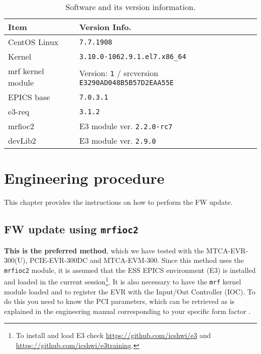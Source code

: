 \documentclass[11pt
  , a4paper
  , article
  , oneside
  , showtrims
]{memoir}
\begin{document}
\begin{table}[!htb]
  \centering
  \begin{tabular}{l|l}
    \toprule
    Item               & Version Info.                                                      \\\midrule
    CentOS Linux       & \texttt{7.7.1908}                                                  \\\midrule
    Kernel             & \texttt{3.10.0-1062.9.1.el7.x86\_64}                               \\\midrule
    mrf kernel module  & Version: \texttt{1} / srcversion \texttt{E3290AD048B5B57D2EAA55E}  \\\midrule
    EPICS base         & \texttt{7.0.3.1}                                                   \\\midrule
    e3-req             & \texttt{3.1.2}                                                     \\\midrule
    mrfioc2            & E3 module ver. \texttt{2.2.0-rc7}                                  \\\midrule
    devLib2            & E3 module ver. \texttt{2.9.0}                                      \\\bottomrule
  \end{tabular}
  \caption[]{Software and its version information.}
  \label{table:swlist}
\end{table}



\chapter{Engineering procedure}
This chapter provides the instructions on how to perform the FW update.\\

\section{FW update using \texttt{mrfioc2}}
\textbf{This is the preferred method}, which we have tested with the MTCA-EVR-300(U), PCIE-EVR-300DC and MTCA-EVM-300. Since this method uses the \texttt{mrfioc2} module, it is assumed that the ESS EPICS environment (E3) is installed and loaded in the current session{\footnote{To install and load E3 check \url{https://github.com/icshwi/e3} and \url{https://github.com/icshwi/e3training}.}}. It is also necessary to have the \texttt{mrf} kernel module loaded and to register the EVR with the Input/Out Controller (IOC). To do this you need to know the PCI parameters, which can be retrieved as is explained in the engineering manual corresponding to your specific form factor \cite{empcieeevr300dc, emmtcaevr300, emmtcaevm300}.\\
\end{document}
